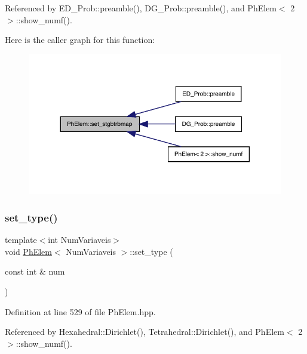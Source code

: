 Referenced by E\+D\+\_\+\+Prob\+::preamble(), D\+G\+\_\+\+Prob\+::preamble(), and Ph\+Elem$<$ 2 $>$\+::show\+\_\+numf().

Here is the caller graph for this function\+:
\nopagebreak
\begin{figure}[H]
\begin{center}
\leavevmode
\includegraphics[width=317pt]{classPhElem_ae63196241e8f39617acb1984cb06910e_icgraph}
\end{center}
\end{figure}
\mbox{\label{classPhElem_ae226a41912e8e7c76be365518b2a38e2}} 
\subsubsection{\texorpdfstring{set\+\_\+type()}{set\_type()}}
{\footnotesize\ttfamily template$<$int Num\+Variaveis$>$ \\
void \hyperlink{classPhElem}{Ph\+Elem}$<$ Num\+Variaveis $>$\+::set\+\_\+type (\begin{DoxyParamCaption}\item[{const int \&}]{num }\end{DoxyParamCaption})}



Definition at line 529 of file Ph\+Elem.\+hpp.



Referenced by Hexahedral\+::\+Dirichlet(), Tetrahedral\+::\+Dirichlet(), and Ph\+Elem$<$ 2 $>$\+::show\+\_\+numf().

